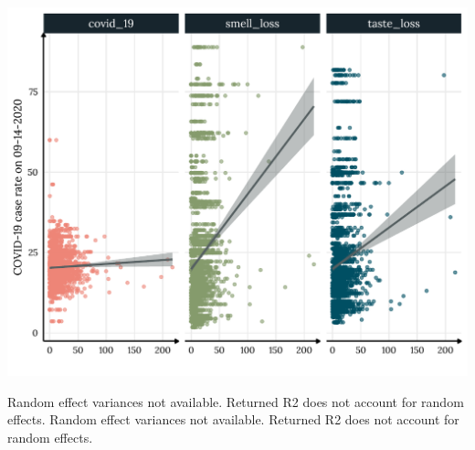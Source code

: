 \documentclass[
]{article}
\begin{document}
\begin{center}\includegraphics[width=0.8\linewidth]{paper1_files/figure-latex/covid_plot-1} \end{center}

Random effect variances not available. Returned R2 does not account for
random effects. Random effect variances not available. Returned R2 does
not account for random effects.
\end{document}
